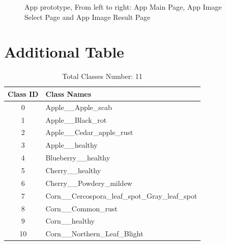 \begin{figure}
    \caption{App prototype, From left to right: App Main Page, App Image Select Page and App Image Result Page}
    \label{fig:app-1}
\end{figure}


\FloatBarrier
\section{Additional Table}


\begin{table}[h]
    \centering
    \begin{tabular}{|c|l|}
        \hline
        \textbf{Class ID} & \textbf{Class Names} \\
        \hline
        0 & Apple\_\_Apple\_scab \\
        \hline
        1 & Apple\_\_Black\_rot \\
        \hline
        2 & Apple\_\_Cedar\_apple\_rust \\
        \hline
        3 & Apple\_\_healthy \\
        \hline
        4 & Blueberry\_\_healthy \\
        \hline
        5 & Cherry\_\_healthy \\
        \hline
        6 & Cherry\_\_Powdery\_mildew \\
        \hline
        7 & Corn\_\_Cercospora\_leaf\_spot\_Gray\_leaf\_spot \\
        \hline
        8 & Corn\_\_Common\_rust \\
        \hline
        9 & Corn\_\_healthy \\
        \hline
        10 & Corn\_\_Northern\_Leaf\_Blight \\
        \hline
    \end{tabular}
    \caption{Total Classes Number: 11}
    \label{tab:class_table}
\end{table}


